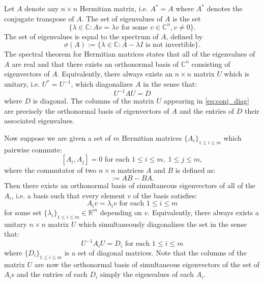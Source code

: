 \documentclass[a4paper]{article}
\begin{document}
Let $A$ denote any $n \times n$ Hermitian matrix, i.e. $A^* = A$ where $A^*$ denotes the conjugate transpose of $A$. The set of eigenvalues of $A$ is the set
\begin{equation}
	\{ \lambda \in \mathbb{C} : A v = \lambda v \text{ for some $v \in \mathbb{C}^n, v \neq 0$}\}.
\end{equation}
The set of eigenvalues is equal to the spectrum of $A$, defined by
\begin{equation}
	\sigma(A) := \{\lambda \in \mathbb{C} : A - \lambda I \text{ is not invertible}\}.
\end{equation}
The spectral theorem for Hermitian matrices \cite{HoffmanKunze} states that all of the eigenvalues of $A$ are real and that there exists an orthonormal basis of $\mathbb{C}^n$ consisting of eigenvectors of $A$. Equivalently, there always exists an $n \times n$ matrix $U$ which is unitary, i.e. $U^* = U^{-1}$, which diagonalizes $A$ in the sense that:
\begin{equation} \label{eq:conj_diag}
	U^{-1} A U = D
\end{equation}
where $D$ is diagonal. The columns of the matrix $U$ appearing in \eqref{eq:conj_diag} are precisely the orthonormal basis of eigenvectors of $A$ and the entries of $D$ their associated eigenvalues.

Now suppose we are given a set of $m$ Hermitian matrices $\{ A_i \}_{1 \leq i \leq m}$ which pairwise commute:
\begin{equation} \label{eq:pw_comm}
	[A_i,A_j] = 0 \text{ for each } 1 \leq i \leq m, \; 1 \leq j \leq m,
\end{equation}
where the commutator of two $n \times n$ matrices $A$ and $B$ is defined as:
\begin{equation}
	[ A, B ] := A B - B A.
\end{equation}
Then there exists \cite{HoffmanKunze} an orthonormal basis of {simultaneous eigenvectors} of all of the $A_i$, i.e. a basis such that every element $v$ of the basis satisfies:
\begin{equation}
	A_i v = \lambda_i v \text{ for each } 1 \leq i \leq m
\end{equation}
for some set $\{\lambda_i\}_{1 \leq i \leq m} \in \mathbb{R}^m$ depending on $v$. Equivalently, there always exists a unitary $n \times n$ matrix $U$ which {simultaneously diagonalizes} the set in the sense that:
\begin{equation}
	U^{-1} A_i U = D_i \text{ for each } 1 \leq i \leq m
\end{equation}
where $\{ D_i \}_{1 \leq i \leq m}$ is a set of diagonal matrices. Note that the columns of the matrix $U$ are now the orthonormal basis of simultaneous eigenvectors of the set of $A_i$s and the entries of each $D_i$ simply the eigenvalues of each $A_i$. 
\end{document}
